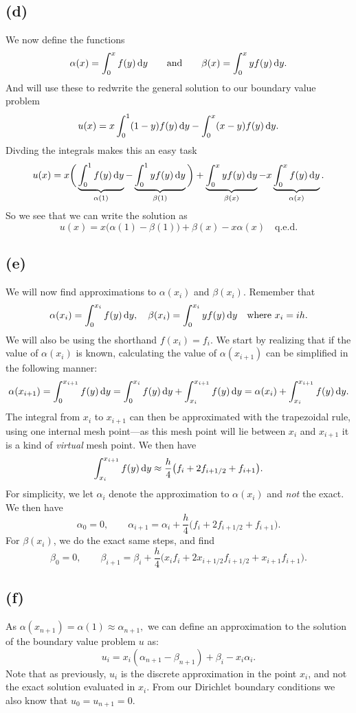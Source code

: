 \documentclass[a4paper, 11pt, notitlepage, english]{article}
\renewcommand{\d}{{\rm d}}
\begin{document}
\clearpage

\subsection*{(d)}
We now define the functions
$$\alpha(x) = \int_0^x f(y) \, \d y \qquad \mbox{and} \qquad \beta(x) = \int_0^x yf(y) \, \d y.$$
And will use these to redwrite the general solution to our boundary value problem
$$u(x) = x\int_0^1 (1-y)f(y)\, \d y - \int_0^x (x-y)f(y)\, \d y.$$
Divding the integrals makes this an easy task
$$u(x) = x\bigg(\underbrace{\int_0^1 f(y) \, \d y}_{\alpha(1)} - \underbrace{\int_0^1 y f(y) \, \d y}_{\beta(1)}\bigg) + \underbrace{\int_0^x yf(y)\, \d y}_{\beta(x)} - x \underbrace{\int_0^x f(y)\, \d y}_{\alpha(x)}.$$
So we see that we can write the solution as
$$u(x) = x\big(\alpha(1)-\beta(1)\big) + \beta(x) - x\alpha(x) \quad \mbox{q.e.d.}$$

\clearpage

\subsection*{(e)}
We will now find approximations to $\alpha(x_i)$ and $\beta(x_i)$. Remember that 
$$\alpha(x_i) = \int_0^{x_i} f(y) \, \d y, \quad \beta(x_i) = \int_0^{x_i} y f(y) \, \d y \quad \mbox {where } x_i = ih.$$
We will also be using the shorthand $f(x_i) = f_i$. We start by realizing that if the value of $\alpha(x_i)$ is known, calculating the value of $\alpha(x_{i+1})$ can be simplified in the following manner:
$$\alpha(x_{i+1}) = \int_0^{x_{i+1}} f(y) \, \d y = \int_0^{x_i}f(y) \, \d y + \int_{x_i}^{x_{i+1}}f(y)\, \d y = \alpha(x_i) + \int_{x_i}^{x_{i+1}}f(y)\, \d y.$$
The integral from $x_i$ to $x_{i+1}$ can then be approximated with the trapezoidal rule, using one internal mesh point---as this mesh point will lie between $x_i$ and $x_{i+1}$ it is a kind of \emph{virtual} mesh point. We then have
$$\int_{x_i}^{x_{i+1}}f(y)\, \d y \approx \frac{h}{4}\big(f_i + 2f_{i+1/2} + f_{i+1}\big).$$
For simplicity, we let $\alpha_i$ denote the approximation to $\alpha(x_i)$ and \emph{not} the exact. We then have
$$\alpha_0 = 0, \qquad \alpha_{i+1} = \alpha_i + \frac{h}{4}\big(f_i + 2f_{i+1/2} + f_{i+1}\big).$$
For $\beta(x_i)$, we do the exact same steps, and find
$$\beta_0 = 0, \qquad \beta_{i+1} = \beta_i + \frac{h}{4}\big(x_if_i + 2x_{i+1/2}f_{i+1/2} + x_{i+1}f_{i+1}\big).$$

\subsection*{(f)}
As $\alpha(x_{n+1}) = \alpha(1) \approx \alpha_{n+1},$ we can define an approximation to the solution of the boundary value problem $u$ as:
$$u_i = x_i(\alpha_{n+1} - \beta_{n+1}) + \beta_i - x_i\alpha_i.$$
Note that as previously, $u_i$ is the discrete approximation in the point $x_i$, and not the exact solution evaluated in $x_i$. From our Dirichlet boundary conditions we also know that
$u_0 = u_{n+1} = 0.$
\end{document}
